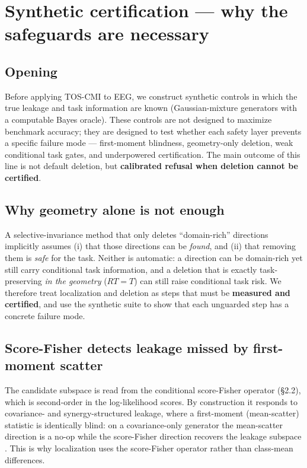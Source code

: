 \section{Synthetic certification --- why the safeguards are necessary}

\subsection{Opening}
Before applying TOS-CMI to EEG, we construct synthetic controls in which the true leakage and task
information are known (Gaussian-mixture generators with a computable Bayes oracle). These controls are not
designed to maximize benchmark accuracy; they are designed to test whether each safety layer prevents a
specific failure mode --- first-moment blindness, geometry-only deletion, weak conditional task gates, and
underpowered certification. The main outcome of this line is not default deletion, but \textbf{calibrated refusal
when deletion cannot be certified}.

\subsection{Why geometry alone is not enough}
A selective-invariance method that only deletes ``domain-rich'' directions implicitly assumes (i) that those
directions can be \emph{found}, and (ii) that removing them is \emph{safe} for the task. Neither is automatic: a
direction can be domain-rich yet still carry conditional task information, and a deletion that is exactly
task-preserving \emph{in the geometry} ($R T = T$) can still raise conditional task risk. We therefore treat
localization and deletion as steps that must be \textbf{measured and certified}, and use the synthetic suite to
show that each unguarded step has a concrete failure mode.

\subsection{Score-Fisher detects leakage missed by first-moment scatter}
The candidate subspace is read from the conditional score-Fisher operator (\S2.2), which is second-order in
the log-likelihood scores. By construction it responds to covariance- and synergy-structured leakage, where
a first-moment (mean-scatter) statistic is identically blind: on a covariance-only generator the
mean-scatter direction is a no-op while the score-Fisher direction recovers the leakage subspace . This
is why localization uses the score-Fisher operator rather than class-mean differences.

